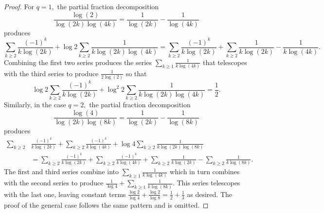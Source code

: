 \documentclass[10pt,a4paper]{amsart}
\begin{document}
\begin{proof}
For $q=1,$ the partial fraction decomposition 
\begin{equation}
\nonumber
\frac{\log\left(2\right)}{\log\left(2k\right)\log\left(4k\right)}=\frac{1}{\log\left(2k\right)}-\frac{1}{\log\left(4k\right)}
\end{equation}
produces
\begin{equation}
\nonumber
\sum_{k\ge2}\frac{\left(-1\right)^{k}}{k\log\left(2k\right)}+\log2\sum_{k\ge2}\frac{1}{k\log\left(2k\right)\log\left(4k\right)}
=\sum_{k\ge2}\frac{\left(-1\right)^{k}}{k\log\left(2k\right)}+\sum_{k\ge2}\frac{1}{k\log\left(2k\right)}-
\frac{1}{k\log\left(4k\right)}.
\end{equation}
Combining the first two series produces the series $\sum_{k\ge1}
\frac{1}{k\log\left(4k\right)}$ that telescopes with the third series to  produce $\frac{1}{2\log(2)}$ so that
\begin{equation}
\nonumber
\log2\sum_{k\ge2}\frac{\left(-1\right)^{k}}{k\log\left(2k\right)}+\log^{2}2\sum_{k\ge2}\frac{1}{k\log\left(2k\right)\log\left(4k\right)}=\frac{1}{2}.
\end{equation}
Similarly, in the case $q=2,$ the partial fraction decomposition 
\begin{equation}
\nonumber
\frac{\log\left(4\right)}{\log\left(2k\right)\log\left(8k\right)}=\frac{1}{\log\left(2k\right)}-\frac{1}{\log\left(8k\right)}
\end{equation}
produces
\begin{align}
\sum_{k\ge2}&\frac{\left(-1\right)^{k}}{k\log\left(2k\right)}+\sum_{k\ge2}\frac{\left(-1\right)^{k}}{k\log\left(4k\right)}+\log4\sum_{k\ge2}\frac{1}{k\log\left(2k\right)\log\left(8k\right)}\nonumber
\\
\nonumber
&=\sum_{k\ge2}\frac{\left(-1\right)^{k}}{k\log\left(2k\right)}+\sum_{k\ge2}\frac{\left(-1\right)^{k}}{k\log\left(4k\right)}+\sum_{k\ge2}\frac{1}{k\log\left(2k\right)}-\sum_{k\ge2}\frac{1}{k\log\left(8k\right)}.
\end{align}
The first and third series combine into $\sum_{k\ge1}\frac{1}{k\log\left(4k\right)}$ which in turn combines with the second series to produce $\frac{1}{\log 4}+\sum_{k\ge1}\frac{1}{k\log\left(8k\right)}.$ This series telescopes with the last one, leaving constant terms
$\frac{\log 2}{\log 4}+\frac{\log 2}{\log 8}=\frac{1}{2}+\frac{1}{3}$ as desired.
The proof of the general case follows the same pattern and is omitted.
\end{proof}
\end{document}
